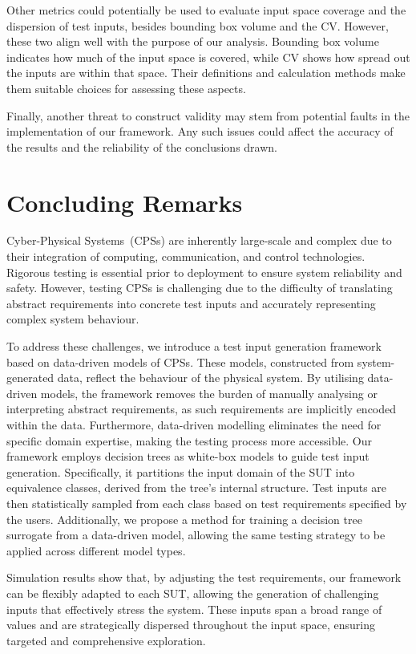 \documentclass[
]{ceurart}
\theoremstyle{definition}
\begin{document}
Other metrics could potentially be used to evaluate input space coverage and the dispersion of test inputs, besides bounding box volume and the CV. However, these two align well with the purpose of our analysis. Bounding box volume indicates how much of the input space is covered, while CV shows how spread out the inputs are within that space. Their definitions and calculation methods make them suitable choices for assessing these aspects.

Finally, another threat to construct validity may stem from potential faults in the implementation of our framework. Any such issues could affect the accuracy of the results and the reliability of the conclusions drawn.

\section{Concluding Remarks}
\label{sec:end}

Cyber-Physical Systems~(CPSs) are inherently large-scale and complex due to their integration of computing, communication, and control technologies. Rigorous testing is essential prior to deployment to ensure system reliability and safety. However, testing CPSs is challenging due to the difficulty of translating abstract requirements into concrete test inputs and accurately representing complex system behaviour.

To address these challenges, we introduce a test input generation framework based on data-driven models of CPSs. These models, constructed from system-generated data, reflect the behaviour of the physical system. By utilising data-driven models, the framework removes the burden of manually analysing or interpreting abstract requirements, as such requirements are implicitly encoded within the data. Furthermore, data-driven modelling eliminates the need for specific domain expertise, making the testing process more accessible. Our framework employs decision trees as white-box models to guide test input generation. Specifically, it partitions the input domain of the SUT into equivalence classes, derived from the tree’s internal structure. Test inputs are then statistically sampled from each class based on test requirements specified by the users. Additionally, we propose a method for training a decision tree surrogate from a data-driven model, allowing the same testing strategy to be applied across different model types. 

Simulation results show that, by adjusting the test requirements, our framework can be flexibly adapted to each SUT, allowing the generation of challenging inputs that effectively stress the system. These inputs span a broad range of values and are strategically dispersed throughout the input space, ensuring targeted and comprehensive exploration.
\end{document}
